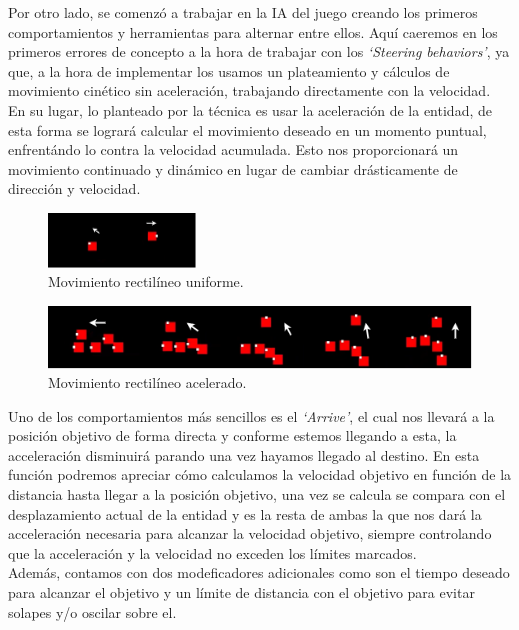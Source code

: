 Por otro lado, se comenzó a trabajar en la \ac{IA} del juego creando los primeros comportamientos
y herramientas para alternar entre ellos. Aquí caeremos en los primeros errores de concepto a la
hora de trabajar con los \textit{`Steering behaviors'}, ya que, a la hora de implementar los
usamos un plateamiento y cálculos de movimiento cinético sin aceleración, trabajando directamente 
con la velocidad.\\
En su lugar, lo planteado por la técnica es usar la aceleración de la entidad, de esta forma se 
logrará calcular el movimiento deseado en un momento puntual, enfrentándo lo contra la velocidad 
acumulada. Esto nos proporcionará un movimiento continuado y dinámico en lugar de cambiar drásticamente de 
dirección y velocidad.

\begin{figure}[htb]
\centering
\includegraphics[width=0.35\textwidth]{imagenes/diario_desarrollo/mov1.png}
\caption{Movimiento rectilíneo uniforme.}
\label{fig:mru}
\end{figure} 

\begin{figure}[htb]
\centering
\includegraphics[width=1\textwidth]{imagenes/diario_desarrollo/mov2.png}
\caption{Movimiento rectilíneo acelerado.}
\label{fig:mra}
\end{figure} 

Uno de los comportamientos más sencillos es el \textit{`Arrive'}, el cual nos
llevará a la posición objetivo de forma directa y conforme estemos llegando a esta, la 
acceleración disminuirá parando una vez hayamos llegado al destino. En esta función podremos
apreciar cómo calculamos la velocidad objetivo en función de la distancia hasta llegar a
la posición objetivo, una vez se calcula se compara con el desplazamiento actual de la entidad
y es la resta de ambas la que nos dará la acceleración necesaria para alcanzar la velocidad
objetivo, siempre controlando que la acceleración y la velocidad no exceden los límites 
marcados.\\
Además, contamos con dos modeficadores adicionales como son el tiempo deseado para alcanzar el
objetivo y un límite de distancia con el objetivo para evitar solapes y/o oscilar sobre el.

